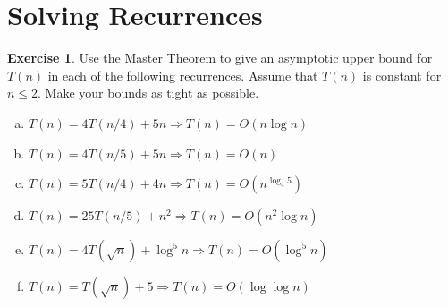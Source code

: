 \documentclass{article}
\theoremstyle{definition}
\newtheorem{exercise}{Exercise}[section]
\begin{document}
\section{Solving Recurrences}

\begin{exercise}
    Use the Master Theorem to give an asymptotic upper bound for $T(n)$ in each of the following recurrences. Assume that $T(n)$ is constant for $n \leq 2$. Make your bounds as tight as possible.
    \begin{enumerate}[a)]
        \item $T(n) = 4T(n/4) + 5n \Longrightarrow T(n)=O(n\log n)$
        \item $T(n) = 4T(n/5) + 5n \Longrightarrow T(n)=O(n)$
        \item $T(n) = 5T(n/4) + 4n \Longrightarrow T(n)=O(n^{\log_4 5})$
        \item $T(n) = 25T(n/5) + n^2 \Longrightarrow T(n)=O(n^2\log n)$
        \item $T(n) = 4T(\sqrt{n}) + \log^5n \Longrightarrow T(n)=O(\log^5 n)$
        \item $T(n) = T(\sqrt{n}) + 5 \Longrightarrow T(n)=O(\log\log n)$
    \end{enumerate}
\end{exercise}
\end{document}
